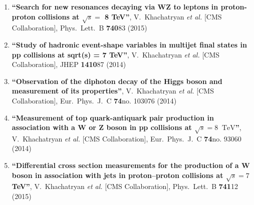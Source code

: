 \begin{enumerate}
\item%
{\bf ``Search for new resonances decaying via WZ to leptons in proton-proton collisions at $\sqrt s =$ 8 TeV''}, 
  V.~Khachatryan {\it et al.}  [CMS Collaboration], 
Phys.\ Lett.\ B {\bf 740}83 (2015) %


\item%
{\bf ``Study of hadronic event-shape variables in multijet final states in pp collisions at sqrt(s) = 7 TeV''}, 
  V.~Khachatryan {\it et al.}  [CMS Collaboration], 
JHEP {\bf 1410}87 (2014) %


\item%
{\bf ``Observation of the diphoton decay of the Higgs boson and measurement of its properties''}, 
  V.~Khachatryan {\it et al.}  [CMS Collaboration], 
Eur.\ Phys.\ J.\ C {\bf 74}no. 103076 (2014) %


\item%
{\bf ``Measurement of top quark-antiquark pair production in association with a W or Z boson in pp collisions at $\sqrt{s} = 8$ $\,\text {TeV}$''}, 
  V.~Khachatryan {\it et al.}  [CMS Collaboration], 
Eur.\ Phys.\ J.\ C {\bf 74}no. 93060 (2014) %


\item%
{\bf ``Differential cross section measurements for the production of a W boson in association with jets in proton–proton collisions at $\sqrt s=7$ TeV''}, 
  V.~Khachatryan {\it et al.}  [CMS Collaboration], 
Phys.\ Lett.\ B {\bf 741}12 (2015) %



\end{enumerate}

